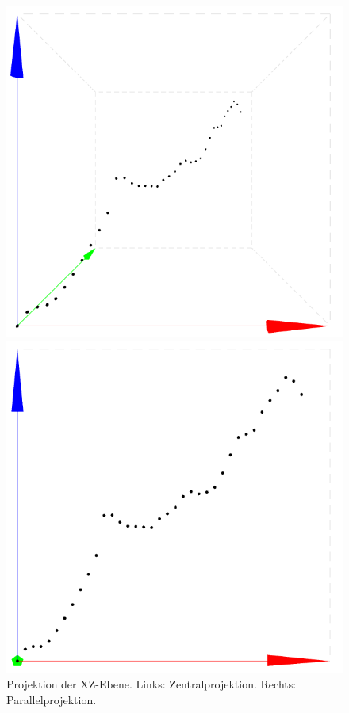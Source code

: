 \begin{figure}[!htbp]
	\centering
	\begin{minipage}{.45\textwidth}
		\includegraphics[width=\linewidth]{images/persp}
	\end{minipage}
	\begin{minipage}{.45\textwidth}
		\includegraphics[width=\linewidth]{images/ortho}
	\end{minipage}
	\caption[Projektion der xz-Ebene]{Projektion der XZ-Ebene. Links: Zentralprojektion. Rechts: Parallelprojektion.}
	\label{fig:projections}
\end{figure}

